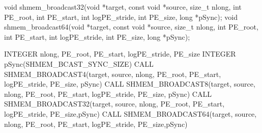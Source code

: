 \synC   %

void shmem_broadcast32(void *target, const void *source, size_t nlong, int PE_root, int PE_start, int logPE_stride, int PE_size, long *pSync);
void shmem_broadcast64(void *target, const void *source, size_t nlong, int PE_root, int PE_start, int logPE_stride, int PE_size, long *pSync);
\synF   %

INTEGER nlong, PE_root, PE_start, logPE_stride, PE_size
INTEGER pSync(SHMEM_BCAST_SYNC_SIZE)
CALL SHMEM_BROADCAST4(target, source, nlong, PE_root, PE_start, logPE_stride, PE_size, pSync)
CALL SHMEM_BROADCAST8(target, source, nlong, PE_root, PE_start, logPE_stride, PE_size, pSync)
CALL SHMEM_BROADCAST32(target, source, nlong, PE_root, PE_start, logPE_stride, PE_size,pSync)
CALL SHMEM_BROADCAST64(target, source, nlong, PE_root, PE_start, logPE_stride, PE_size,pSync)

